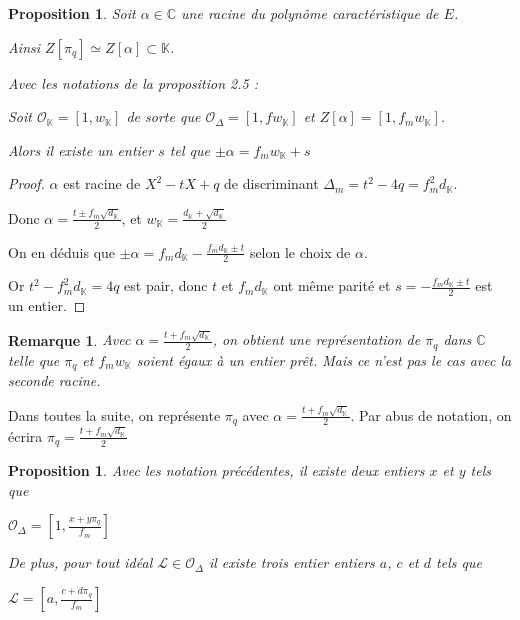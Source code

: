 \documentclass{article}
\newcommand{\C}[0]{\mathbb{C}}
\newcommand{\K}[0]{\mathbb{K}}
\newcommand{\OR}[0]{\mathcal{O}}
\newcommand{\LR}[0]{\mathcal{L}}
\newtheorem{Prop}[The]{Proposition}
\newtheorem{Rem}[The]{Remarque}
\begin{document}
\begin{Prop}
	
	Soit $\alpha\in\C$ une racine du polynôme caractéristique de $E$.
	 
	Ainsi $Z[\pi_{q}] \simeq Z[\alpha] \subset \K$.
	
	Avec les notations de la proposition 2.5 :
	
	Soit $\OR_{\K} = \left[ 1, w_{\K}\right] $ de sorte que $\OR_{\Delta} = \left[ 1, fw_{\K}\right] $ et $Z[\alpha] = \left[ 1, f_{m}w_{\K}\right] $.
	
	Alors il existe un entier $s$ tel que $\pm\alpha = f_{m}w_{\K} + s$
	
\end{Prop}

\begin{proof}
	
	$\alpha$ est racine de $X^{2} - tX + q$ de discriminant $\Delta_{m} = t^{2} - 4q = f_{m}^{2}d_{\K}$.
	
	Donc $\alpha = \frac{t\pm f_{m}\sqrt{d_{\K}}}{2}$, et $w_{\K} = \frac{d_{\K} + \sqrt{d_{\K}}}{2}$
	
	On en déduis que  $\pm\alpha = f_{m}d_{\K} - \frac{f_{m}d_{\K} \pm t}{2}$ selon le choix de $\alpha$.
	
	Or $t^{2} - f_{m}^{2}d_{\K} = 4q$ est pair, donc $t$ et $f_{m}d_{\K}$ ont même parité et $s = -\frac{f_{m}d_{\K} \pm t}{2}$ est un entier.
	
\end{proof}

\begin{Rem}
	Avec $\alpha = \frac{t + f_{m}\sqrt{d_{\K}}}{2}$, on obtient une représentation de $\pi_{q}$ dans $\C$ telle que $\pi_{q}$ et $f_{m}w_{\K}$ soient égaux à un entier prêt. Mais ce n'est pas le cas avec la seconde racine.
\end{Rem}

Dans toutes la suite, on représente $\pi_{q}$ avec $\alpha = \frac{t + f_{m}\sqrt{d_{\K}}}{2}$. Par abus de notation, on écrira $\pi_{q} = \frac{t + f_{m}\sqrt{d_{\K}}}{2}$

\begin{Prop}
	
	Avec les notation précédentes, il existe deux entiers $x$ et $y$ tels que
	
	 $\OR_{\Delta} = \left[ 1, \frac{x + y\pi_{q}}{f_{m}}\right] $
	
	De plus, pour tout idéal $\LR\in\OR_{\Delta}$ il existe trois entier entiers $a$, $c$ et $d$ tels que 
	
	$\LR = \left[ a, \frac{c + d\pi_{q}}{f_{m}}\right] $
	
\end{Prop}
\end{document}
